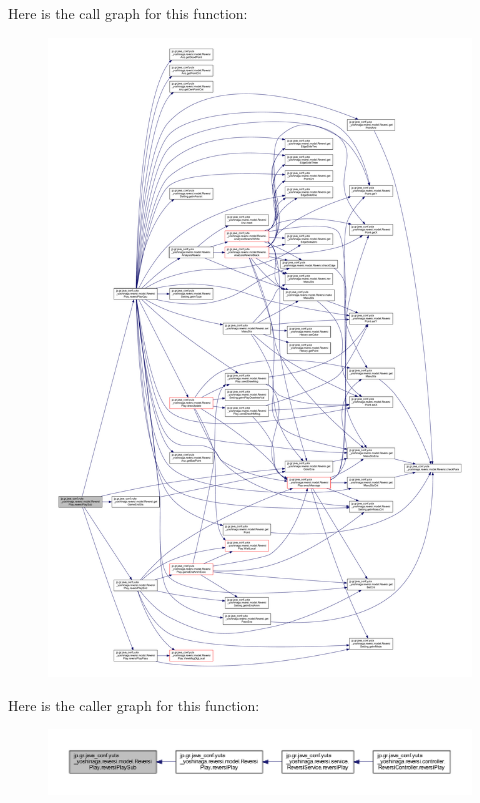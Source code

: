 Here is the call graph for this function\+:
\nopagebreak
\begin{figure}[H]
\begin{center}
\leavevmode
\includegraphics[width=350pt]{classjp_1_1gr_1_1java__conf_1_1yuta__yoshinaga_1_1reversi_1_1model_1_1_reversi_play_a6ea2a343ad2fb3ef1317570e87c3fc4f_cgraph}
\end{center}
\end{figure}
Here is the caller graph for this function\+:
\nopagebreak
\begin{figure}[H]
\begin{center}
\leavevmode
\includegraphics[width=350pt]{classjp_1_1gr_1_1java__conf_1_1yuta__yoshinaga_1_1reversi_1_1model_1_1_reversi_play_a6ea2a343ad2fb3ef1317570e87c3fc4f_icgraph}
\end{center}
\end{figure}
